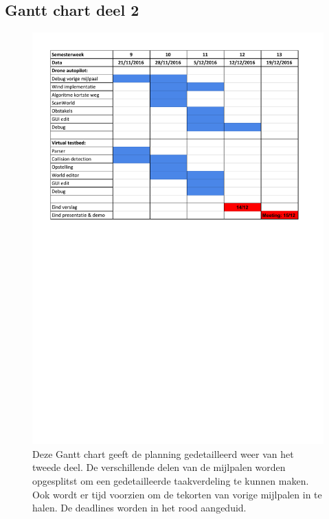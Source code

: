 \subsection{Gantt chart deel 2} 
	\begin{figure}[H]
		\begin{center}
			\includegraphics[scale=0.65]{Planning_Deel2.pdf}
		\end{center}
		\caption{Deze Gantt chart geeft de planning gedetailleerd weer van het tweede deel. De verschillende delen van de mijlpalen worden opgesplitst om een gedetailleerde taakverdeling te kunnen maken. Ook wordt er tijd voorzien om de tekorten van vorige mijlpalen in te halen. De deadlines worden in het rood aangeduid.}
	\end{figure}